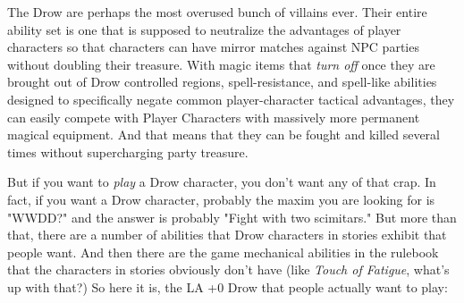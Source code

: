 
The Drow are perhaps the most overused bunch of villains ever. Their entire ability set is one that is supposed to neutralize the advantages of player characters so that characters can have mirror matches against NPC parties without doubling their treasure. With magic items that \textit{turn off} once they are brought out of Drow controlled regions, spell-resistance, and spell-like abilities designed to specifically negate common player-character tactical advantages, they can easily compete with Player Characters with massively more permanent magical equipment. And that means that they can be fought and killed several times without supercharging party treasure.

But if you want to \textit{play} a Drow character, you don't want any of that crap. In fact, if you want a Drow character, probably the maxim you are looking for is "WWDD?" and the answer is probably "Fight with two scimitars." But more than that, there are a number of abilities that Drow characters in stories exhibit that people want. And then there are the game mechanical abilities in the rulebook that the characters in stories obviously don't have (like \textit{Touch of Fatigue}, what's up with that?) So here it is, the LA +0 Drow that people actually want to play:
